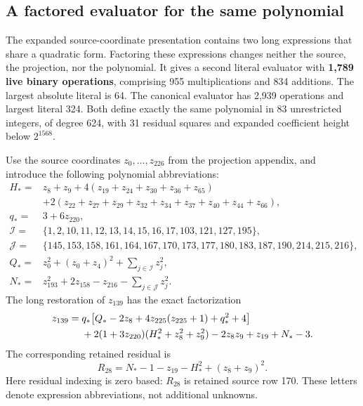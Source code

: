 \subsection{A factored evaluator for the same polynomial}
\label{sec:factored-evaluator}

The expanded source-coordinate presentation contains two long expressions
that share a quadratic form. Factoring these expressions changes neither
the source, the projection, nor the polynomial. It gives a second literal
evaluator with \textbf{1,789 live binary operations}, comprising 955
multiplications and 834 additions. The largest absolute literal is 64.
The canonical evaluator has 2,939 operations and largest literal 324.
Both define exactly the same polynomial in 83 unrestricted integers, of
degree 624, with 31 residual squares and expanded coefficient height below
$2^{1568}$.

Use the source coordinates $z_0,\ldots,z_{226}$ from the projection appendix,
and introduce the following polynomial abbreviations:
\begin{align*}
 H_*={}&z_8+z_9+4(z_{19}+z_{24}+z_{30}+z_{36}+z_{65})\\
       &+2(z_{22}+z_{27}+z_{29}+z_{32}+z_{34}
                    +z_{37}+z_{40}+z_{44}+z_{66}),\\
 q_*={}&3+6z_{220},\\
 \mathcal I={}&\{1,2,10,11,12,13,14,15,16,17,103,121,127,195\},\\
 \mathcal J={}&\{145,153,158,161,164,167,170,173,
                  177,180,183,187,190,214,215,216\},\\
 Q_*={}&z_0^2+(z_0+z_4)^2+\sum_{j\in\mathcal I}z_j^2,\\
 N_*={}&z_{193}^2+2z_{158}-z_{216}-\sum_{j\in\mathcal J}z_j^2.
\end{align*}
The long restoration of $z_{139}$ has the exact factorization
\begin{align}
 z_{139}={}&
 q_*\bigl[Q_*-2z_8+4z_{225}(z_{225}+1)+q_*^2+4\bigr]\notag\\
 &+2(1+3z_{220})(H_*^2+z_8^2+z_9^2)
       -2z_8z_9+z_{19}+N_*-3.\label{eq:factored-z139}
\end{align}
The corresponding retained residual is
\begin{equation}
 R_{28}=N_*-1-z_{19}-H_*^2+(z_8+z_9)^2.
 \label{eq:factored-R28}
\end{equation}
Here residual indexing is zero based: $R_{28}$ is retained source row 170.
These letters denote expression abbreviations, not additional unknowns.

